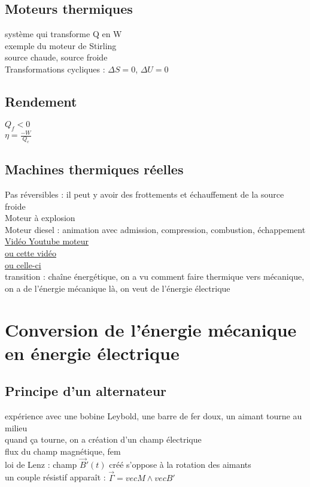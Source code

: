 \subsection{Moteurs thermiques}
système qui transforme Q en W \\
exemple du moteur de Stirling \\
source chaude, source froide \\
Transformations cycliques : $\Delta S=0$, $\Delta U=0$ \\

\subsection{Rendement}
$Q_f<0$ \\
$\eta = \frac{-W}{Q_c}$  \\

\subsection{Machines thermiques réelles}
Pas réversibles : il peut y avoir des frottements et échauffement de la source froide \\
Moteur à explosion \\
Moteur diesel : animation avec admission, compression, combustion, échappement \\
\href{https://youtu.be/CyIz7AfiF04}{Vidéo Youtube moteur} \\
\href{https://youtu.be/DKF5dKo_r_Y}{ou cette vidéo} \\
\href{https://www.youtube.com/watch?v=aqfzJDOQl7M}{ou celle-ci} \\
transition : chaîne énergétique, on a vu comment faire thermique vers mécanique, on a de l'énergie mécanique là, on veut de l'énergie électrique

\section{Conversion de l'énergie mécanique en énergie électrique}
\subsection{Principe d'un alternateur}
expérience avec une bobine Leybold, une barre de fer doux, un aimant tourne au milieu \\ 
quand ça tourne, on a création d'un champ électrique \\
flux du champ magnétique, fem \\
loi de Lenz : champ $\vec{B}'(t)$ créé s'oppose à la rotation des aimants \\
un couple résistif apparaît : $\vec{\Gamma}=vec{M} \wedge vec{B'}$ \\

